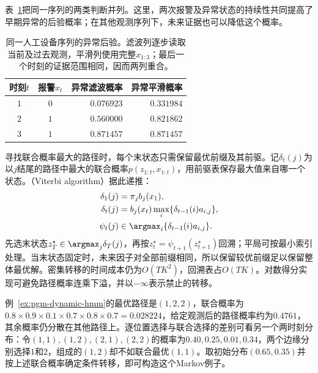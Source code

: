 表~\ref{tab:pgm-dynamic-hmm-example}把同一序列的两类判断并列。这里，两次报警及异常状态的持续性共同提高了早期异常的后验概率；在其他观测序列下，未来证据也可以降低这个概率。

\begin{table}[htbp]
  \centering
  \begin{tabular}{ccrr}
    \toprule
    时刻$t$ & 报警$x_t$ & 异常滤波概率 & 异常平滑概率 \\
    \midrule
    $1$ & $0$ & $0.076923$ & $0.331984$ \\
    $2$ & $1$ & $0.560000$ & $0.821862$ \\
    $3$ & $1$ & $0.871457$ & $0.871457$ \\
    \bottomrule
  \end{tabular}
  \caption{同一人工设备序列的异常后验。滤波列逐步读取当前及过去观测，平滑列使用完整$x_{1:3}$；最后一个时刻的证据范围相同，因而两列重合。}
  \label{tab:pgm-dynamic-hmm-example}
\end{table}

寻找联合概率最大的路径时，每个末状态只需保留最优前缀及其前驱。记$\delta_t(j)$为以$j$结尾的路径中最大的联合概率$p(z_{1:t},x_{1:t})$，用前驱表保存最大值来自哪一个状态。（Viterbi algorithm）据此递推：
\begin{equation}
  \begin{aligned}
    \delta_1(j)&=\pi_jb_j(x_1),\\
    \delta_t(j)&=b_j(x_t)\max_i
      \{\delta_{t-1}(i)a_{i,j}\},\\
    \psi_t(j)&\in\argmax_i
      \{\delta_{t-1}(i)a_{i,j}\}.
  \end{aligned}
  \label{eq:pgm-dynamic-viterbi}
\end{equation}
先选末状态$z_T^\star\in\argmax_j\delta_T(j)$，再按$z_t^\star=\psi_{t+1}(z_{t+1}^\star)$回溯；平局可按最小索引处理。当末状态固定时，未来因子对全部前缀相同，所以保留较优前缀足以保留整体最优解。密集转移的时间成本仍为$O(TK^2)$，回溯表占$O(TK)$。对数得分实现可避免路径概率连乘下溢，并以$-\infty$表示禁止的转移。

例~\ref{ex:pgm-dynamic-hmm}的最优路径是$(1,2,2)$，联合概率为$0.8\times0.9\times0.1\times0.7\times0.8\times0.7=0.028224$，给定观测后的路径概率约为$0.4761$，其余概率仍分散在其他路径上。逐位置选择与联合选择的差别可看另一个两时刻分布：令$(1,1),(1,2),(2,1),(2,2)$的概率为$0.40,0.25,0.01,0.34$，两个边缘分别选择$1$和$2$，组成的$(1,2)$却不如联合最优$(1,1)$。取初始分布$(0.65,0.35)$并按上述联合概率确定条件转移，即可构造这个Markov例子。

